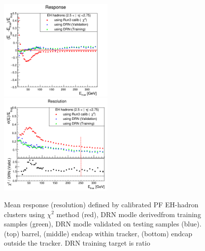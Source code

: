 \begin{figure}
\includegraphics[width=0.495\textwidth]{./plots_pdf/HCAL_plots/Trained_target_ratioflip_0_500_10/pdf/EH_ec_out/EC_outside_tracker_corrEtaEndcapEcalHcal.png}
\includegraphics[width=0.495\textwidth]{./plots_pdf/HCAL_plots/Trained_target_ratioflip_0_500_10/pdf/EH_ec_out/EC_outside_tracker_corrEtaEndcapEcalHcal_reso.png}
\caption[ Response (resolution) vs \pt of the PF EH-hadron cluster - traget true ratio]{Mean response (resolution) defined by calibrated PF EH-hadron clusters using $\chi^{2}$ method (red), DRN modle derivedfrom training samples (green), DRN modle validated on testing samples (blue). (top) barrel, (middle) endcap within tracker, (bottom) endcap outside the tracker. DRN training target is ratio}
\end{figure}

